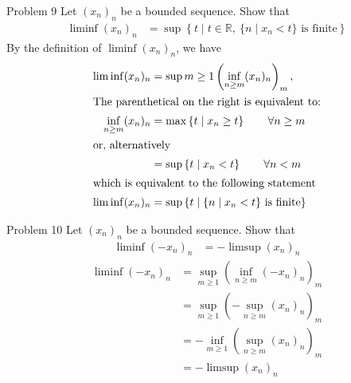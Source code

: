 \documentclass[10pt]{extarticle}
\newcommand{\R}{\mathbb{R}}
\begin{document}
  \begin{problem}{Problem 9}
    Let $(x_n)_n$ be a bounded sequence. Show that
    \begin{align*}
      \liminf(x_n)_n &= \sup \left\{t\mid t\in\R,~\{n\mid x_{n}<t\}\text{ is finite} \right\}
    \end{align*}
    \tcblower
    By the definition of $\liminf(x_n)_n$, we have
    \begin{align*}
      \liminf(x_n)_n &= \sup{m\geq 1}\left(\inf_{n\geq m}(x_n)_n\right)_m,\\
      \shortintertext{The parenthetical on the right is equivalent to:}
      \inf_{n\geq m}(x_n)_n &= \max\left\{t \mid x_{n} \geq t\right\} \tag*{$\forall n\geq m$}\\
      \shortintertext{or, alternatively}
                            &= \sup\left\{t \mid x_{n} < t\right\} \tag*{$\forall n < m$}\\
                            \shortintertext{which is equivalent to the following statement}
      \liminf(x_n)_n &= \sup\left\{t\mid \{n\mid x_{n} < t\}\text{ is finite}\right\}
    \end{align*}
  \end{problem}
  \begin{problem}{Problem 10}
    Let $(x_n)_n$ be a bounded sequence. Show that
    \begin{align*}
      \liminf(-x_n)_n &= -\limsup(x_n)_n
    \end{align*}
    \tcblower
    \begin{align*}
      \liminf(-x_n)_n &= \sup_{m\geq 1}\left(\inf_{n\geq m}(-x_n)_n\right)_m\\
                      &= \sup_{m\geq 1}\left(-\sup_{n\geq m}(x_n)_n\right)_m\\
                      &= -\inf_{m\geq 1}\left(\sup_{n\geq m}(x_n)_n\right)_m\\
                      &=-\limsup(x_n)_n
    \end{align*}
  \end{problem}
\end{document}
